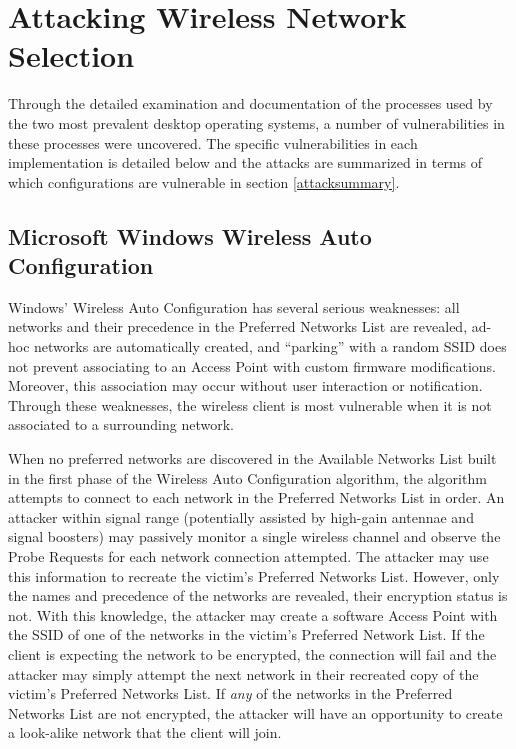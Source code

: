 \documentclass[10pt,twocolumn]{article}
\begin{document}
\section{Attacking Wireless Network Selection}
\label{attacking}

Through the detailed examination and documentation of the processes used
by the two most prevalent desktop operating systems, a number of
vulnerabilities in these processes were uncovered.  The specific
vulnerabilities in each implementation is detailed below and the
attacks are summarized in terms of which configurations are vulnerable
in section \ref{attacksummary}.

\subsection{Microsoft Windows Wireless Auto Configuration}

Windows' Wireless Auto Configuration has several serious weaknesses:
all networks and their precedence in the Preferred Networks List are
revealed, ad-hoc networks are automatically created, and ``parking''
with a random SSID does not prevent associating to an Access Point
with custom firmware modifications.  Moreover, this association may
occur without user interaction or notification.  Through these
weaknesses, the wireless client is most vulnerable when it is not
associated to a surrounding network.

When no preferred networks are discovered in the Available Networks
List built in the first phase of the Wireless Auto Configuration
algorithm, the algorithm attempts to connect to each network in the
Preferred Networks List in order.  An attacker within signal range
(potentially assisted by high-gain antennae and signal boosters) may
passively monitor a single wireless channel and observe the Probe
Requests for each network connection attempted.  The attacker may use
this information to recreate the victim's Preferred Networks List.
However, only the names and precedence of the networks are revealed,
their encryption status is not.  With this knowledge, the attacker may
create a software Access Point with the SSID of one of the networks in
the victim's Preferred Network List.  If the client is expecting the
network to be encrypted, the connection will fail and the attacker may
simply attempt the next network in their recreated copy of the
victim's Preferred Networks List.  If {\it any} of the networks in the
Preferred Networks List are not encrypted, the attacker will have an
opportunity to create a look-alike network that the client will join.
\end{document}
